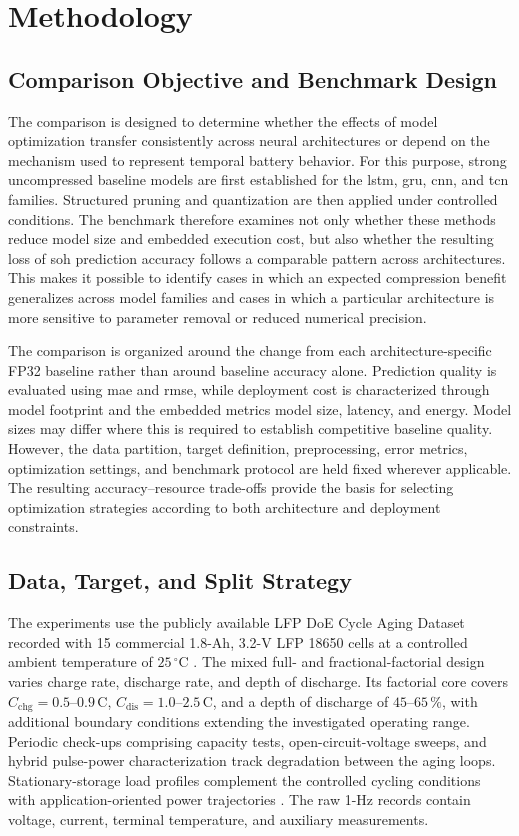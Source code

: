 \documentclass[final,3p,times]{elsarticle}
\begin{document}
\section{Methodology}
\subsection{Comparison Objective and Benchmark Design}
The comparison is designed to determine whether the effects of model optimization transfer consistently across neural architectures or depend on the mechanism used to represent temporal battery behavior. For this purpose, strong uncompressed baseline models are first established for the \ac{lstm}, \ac{gru}, \ac{cnn}, and \ac{tcn} families. Structured pruning and quantization are then applied under controlled conditions. The benchmark therefore examines not only whether these methods reduce model size and embedded execution cost, but also whether the resulting loss of \ac{soh} prediction accuracy follows a comparable pattern across architectures. This makes it possible to identify cases in which an expected compression benefit generalizes across model families and cases in which a particular architecture is more sensitive to parameter removal or reduced numerical precision.

The comparison is organized around the change from each architecture-specific FP32 baseline rather than around baseline accuracy alone. Prediction quality is evaluated using \ac{mae} and \ac{rmse}, while deployment cost is characterized through model footprint and the embedded metrics model size, latency, and energy. Model sizes may differ where this is required to establish competitive baseline quality. However, the data partition, target definition, preprocessing, error metrics, optimization settings, and benchmark protocol are held fixed wherever applicable. The resulting accuracy--resource trade-offs provide the basis for selecting optimization strategies according to both architecture and deployment constraints.

\subsection{Data, Target, and Split Strategy}
The experiments use the publicly available LFP DoE Cycle Aging Dataset recorded with 15 commercial 1.8-Ah, 3.2-V LFP 18650 cells at a controlled ambient temperature of $25\,^{\circ}\mathrm{C}$ \cite{ProductSpecificationJGCFR186501800mAh32V,rzepka_design_2025}. The mixed full- and fractional-factorial design varies charge rate, discharge rate, and depth of discharge. Its factorial core covers $C_{\mathrm{chg}}=0.5$--$0.9\,\mathrm{C}$, $C_{\mathrm{dis}}=1.0$--$2.5\,\mathrm{C}$, and a depth of discharge of $45$--$65\,\%$, with additional boundary conditions extending the investigated operating range. Periodic check-ups comprising capacity tests, open-circuit-voltage sweeps, and hybrid pulse-power characterization track degradation between the aging loops. Stationary-storage load profiles complement the controlled cycling conditions with application-oriented power trajectories \cite{kucevicStandardBatteryEnergy2020}. The raw 1-Hz records contain voltage, current, terminal temperature, and auxiliary measurements.
\end{document}
